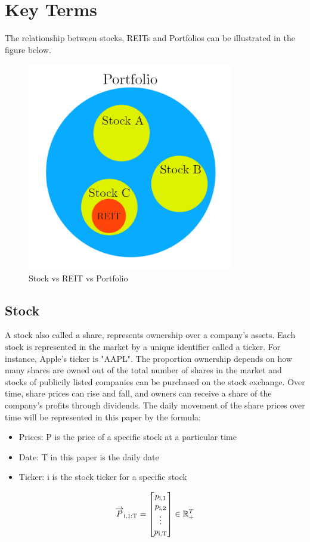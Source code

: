\documentclass[a4paper,12pt]{report}
\numberwithin{equation}{section}
\theoremstyle{definition}
\begin{document}
\section{Key Terms}
The relationship between stocks, REITs and Portfolios can be illustrated in the figure below.
\begin{figure}[H]
  \centerline{\includegraphics[width=9cm]{Stock_Porfolio_Reit}}
  \caption{Stock vs REIT vs Portfolio}\label{visina8}
  \label{fig:Stock_Porfolio_Reit}
  \end{figure}
\subsection{Stock}
A stock also called a share, represents ownership over a company's assets. Each stock is represented in the market by a unique identifier called a ticker. For instance, Apple's ticker is "AAPL". The proportion ownership depends on how many shares are owned out of the total number of shares in the market and stocks of publicily listed companies can be purchased on the stock exchange. Over time, share prices can rise and fall, and owners can receive a share of the company's profits through dividends. The daily movement of the share prices over time will be represented in this paper by the formula:

\begin{itemize}

  \item {Prices: P is the price of a specific stock at a particular time}
  \item {Date: T in this paper is the daily date}
  \item {Ticker: i is the stock ticker for a specific stock}
  
\end{itemize}
\begin{equation*}
  \overrightarrow{P}\textsubscript{i,1:T} =  
  \begin{bmatrix}
    p\textsubscript{i,1} \\
    p\textsubscript{i,2} \\
    \vdots \\
    p\textsubscript{i,T} \\
  \end{bmatrix}
  \in \mathbb{R}_+^{T}
\end{equation*}
\end{document}
